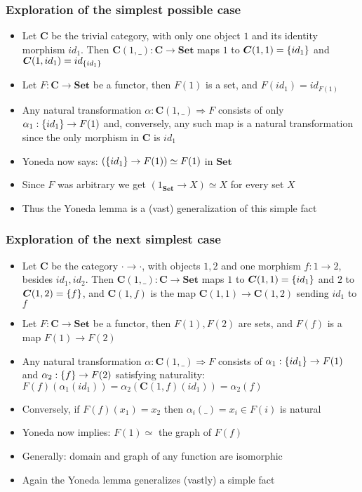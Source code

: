 \documentclass[handout]{beamer}
\newcommand{\To}{\Rightarrow}
\newcommand{\bfsf}[1]{{\boldsymbol{#1}}}
\newcommand{\Set}{\bfsf{Set}}
\newcommand{\CC}{\bfsf{C}}
\begin{document}
\frame
  {   
    \frametitle{Exploration of the simplest possible case}\label{Yon:Triv}

 \begin{itemize}[<+->]
\item Let $\CC$ be the trivial category, with only one object $1$ and
 its identity morphism $id_1$. Then $\CC(1,\_):\CC\to\Set$ maps
$1$ to $\CC(1,1) = \set{id_1}$ and $\CC(1,id_1) = id_{\set{id_1}}$
\item Let $F:\CC\to\Set$ be a functor, then $F(1)$ is a set, and
$F(id_1) = id_{F(1)}$
\item Any natural transformation $\alpha: \CC(1,\_)\To F$ consists of
only $\alpha_1: \{id_1\} \to F(1)$ and,
conversely, any such map is a natural transformation
since the only morphism in $\CC$ is $id_1$
\item Yoneda now says:  $(\{id_1\} \to F(1)) \simeq F(1)$ in $\Set$
\item Since $F$ was arbitrary we get  $(1_\Set \to X) \simeq X$ for every set $X$
\item Thus the Yoneda lemma is a (vast) generalization of this simple fact
 \end{itemize}

 }

\frame
  {   
    \frametitle{Exploration of the next simplest case}\label{Yon:Triv}

 \begin{itemize}[<+->]
\item Let $\CC$ be the category ${\cdot}{\to}{\cdot}$, with objects $1,2$ and
one morphism $f:1\to 2$, besides $id_1,id_2$. Then $\CC(1,\_):\CC\to\Set$ maps
$1$ to $\CC(1,1) = \set{id_1}$ and $2$ to $\CC(1,2) = \set{f}$, and
$\CC(1,f)$ is the map $\CC(1,1)\to\CC(1,2)$ sending $id_1$ to $f$  
\item Let $F:\CC\to\Set$ be a functor, then $F(1), F(2)$ are sets, and
$F(f)$ is a map ${F(1)}\to{F(2)}$
\item Any natural transformation $\alpha: \CC(1,\_)\To F$ consists of
$\alpha_1: \{id_1\} \to F(1)$ and $\alpha_2: \{f\} \to F(2)$ satisfying 
naturality: $F(f)(\alpha_1(id_1)) = \alpha_2(\CC(1,f)(id_1)) = \alpha_2(f)$
\item Conversely, if $F(f)(x_1) = x_2$ then  $\alpha_i(\_) = x_i \in F(i)$ is natural
\item Yoneda now implies:   $F(1) \simeq{}$ the graph of $F(f)$
\item Generally: domain and graph of any function are isomorphic
\item Again  the Yoneda lemma generalizes (vastly) a simple fact
 \end{itemize}

 }
\end{document}
